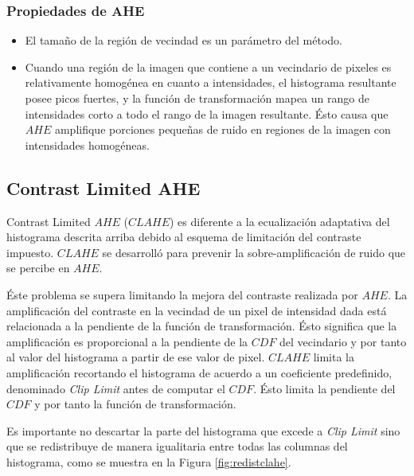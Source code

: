 \subsubsection{Propiedades de AHE}

\begin{itemize}
    \item El tamaño de la región de vecindad es un parámetro del método. 
    \item Cuando una región de la imagen que contiene a un vecindario de pixeles es relativamente homogénea en cuanto a intensidades, el histograma resultante posee picos fuertes, y la función de transformación mapea un rango de intensidades corto a todo el rango de la imagen resultante. Ésto causa que $AHE$ amplifique porciones pequeñas de ruido en regiones de la imagen con intensidades homogéneas.
\end{itemize}

\subsection{Contrast Limited AHE}

Contrast Limited $AHE$ ($CLAHE$) es diferente a la ecualización adaptativa del histograma descrita arriba debido al esquema de limitación del contraste impuesto. $CLAHE$ se desarrolló para prevenir la sobre-amplificación de ruido que se percibe en $AHE$.

Éste problema se supera limitando la mejora del contraste realizada por $AHE$. La amplificación del contraste en la vecindad de un pixel de intensidad dada está relacionada a la pendiente de la función de transformación. Ésto significa que la amplificación es proporcional a la pendiente de la $CDF$ del vecindario y por tanto al valor del histograma a partir de ese valor de pixel. $CLAHE$ limita la amplificación recortando el histograma de acuerdo a un coeficiente predefinido, denominado \textit{Clip Limit} antes de computar el $CDF$. Ésto limita la pendiente del $CDF$ y por tanto la función de transformación.

Es importante no descartar la parte del histograma que excede a \textit{Clip Limit}\label{symbol:clahecliplimit} sino que se redistribuye de manera igualitaria entre todas las columnas del histograma, como se muestra en la Figura \ref{fig:redistclahe}.

